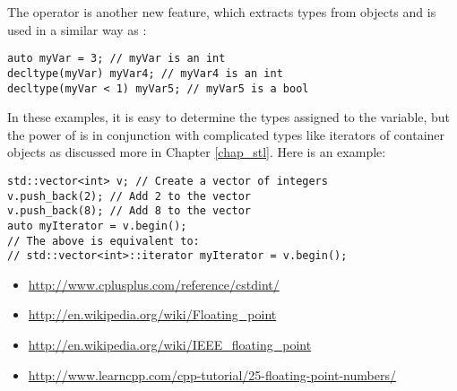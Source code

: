 The  operator is another new feature, which extracts types from objects and is used in a similar way as :

\begin{lstlisting}
auto myVar = 3; // myVar is an int
decltype(myVar) myVar4; // myVar4 is an int
decltype(myVar < 1) myVar5; // myVar5 is a bool
\end{lstlisting}

In these examples, it is easy to determine the types assigned to the variable, but the power of  is in conjunction with complicated types like iterators of container objects as discussed more in Chapter \ref{chap_stl}. Here is an example:

\begin{lstlisting}
std::vector<int> v; // Create a vector of integers
v.push_back(2); // Add 2 to the vector
v.push_back(8); // Add 8 to the vector
auto myIterator = v.begin();
// The above is equivalent to:
// std::vector<int>::iterator myIterator = v.begin();
\end{lstlisting}






\begin{itemize}
\item \url{http://www.cplusplus.com/reference/cstdint/}
\item \url{http://en.wikipedia.org/wiki/Floating_point}
\item \url{http://en.wikipedia.org/wiki/IEEE_floating_point}
\item \url{http://www.learncpp.com/cpp-tutorial/25-floating-point-numbers/}
\end{itemize}	

